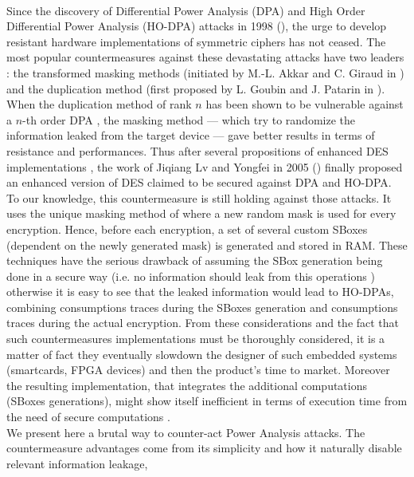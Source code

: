 \documentclass[11pt,a4paper]{article}
\begin{document}
\paragraph{}
Since the discovery of Differential Power Analysis (DPA) and High Order Differential Power Analysis (HO-DPA) attacks in 1998 (\cite{Kocher98}), the urge to develop resistant hardware
implementations of symmetric ciphers has not ceased. The most popular countermeasures against these devastating attacks have two leaders : the transformed masking methods (initiated by
M.-L. Akkar and C. Giraud in \cite{AkkarGiraud01}) and the duplication method (first proposed by L. Goubin and J. Patarin in \cite{GoubinPatarin99}). When the duplication 
method of rank $n$ has been shown to be vulnerable against a $n$-th order DPA \cite{AkkarGoubin03}, the masking method --- which try to randomize the information leaked from the target 
device --- gave better results in terms of resistance and performances. Thus after several propositions of enhanced DES implementations 
\cite{AkkarGiraud01, AkkarGoubin03, AkkarBevanGoubin04} , the work of Jiqiang Lv and Yongfei 
in 2005 (\cite{JiqiangLvYongfei05}) finally proposed an enhanced version of DES
claimed to be secured against DPA and HO-DPA. To our knowledge, this countermeasure is still holding against those attacks. It uses the unique masking method of \cite{AkkarGoubin03} 
where a new random mask is used for every encryption. Hence,
before each encryption, a set of several custom SBoxes (dependent on the newly generated mask) is generated and stored in RAM. These techniques have the serious drawback of assuming the
SBox generation being done in a secure way (i.e. no information should leak from this operations \cite{AkkarGoubin03}) otherwise it is easy to see that the leaked information would lead to 
HO-DPAs, combining consumptions traces during the SBoxes generation and consumptions traces during the actual encryption. 
From these considerations and the fact that such countermeasures implementations must be thoroughly considered, it is a matter of fact they eventually slowdown the designer of such embedded systems (smartcards, FPGA devices) and then the product's time to market. 
Moreover the resulting implementation, that integrates the additional computations (SBoxes generations), might show itself inefficient in terms of execution time 
from the need of secure computations \cite{AkkarGoubin03}. \\
We present here a brutal way to counter-act Power Analysis attacks. The countermeasure advantages come from its simplicity and how it naturally disable relevant information leakage, 
\end{document}
